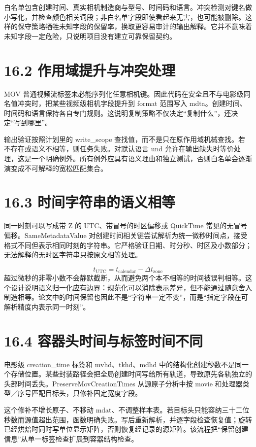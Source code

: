 \documentclass[UTF8,zihao=-4,openany]{ctexbook}
\begin{document}
白名单包含创建时间、真实相机制造商与型号、时间码和语言。冲突检测对键名做小写化，并检查颜色相关词段；非白名单字段即使看起来无害，也可能被删除。这样的保守策略牺牲未知字段的保留率，换取更容易审计的输出解释。它并不意味着未知字段一定危险，只说明项目没有建立可靠保留契约。


\section*{16.2 作用域提升与冲突处理}
MOV 普通视频流标签未必能序列化任意相机键。因此代码在安全且不与电影级同名值冲突时，把某些视频级相机字段提升到 format 范围写入 mdta。创建时间、时间码和语言保持各自专门规则。这说明复制策略不仅决定“复制什么”，还决定“写到哪里”。

输出验证按照计划里的 write\_scope 查找值，而不是只在原作用域机械查找。若不存在或语义不相等，则任务失败。对默认语言 und 允许在输出缺失时等价处理，这是一个明确例外。所有例外应具有语义理由和独立测试，否则白名单会逐渐演变成不可解释的宽松匹配集合。


\section*{16.3 时间字符串的语义相等}
同一时刻可以写成带 Z 的 UTC、带冒号的时区偏移或 QuickTime 常见的无冒号偏移。SameMetadataValue 对创建时间相关键尝试解析为统一微秒时间点，接受格式不同但表示相同时刻的字符串。它严格验证日期、时分秒、时区及小数部分；无法解释的无时区字符串只按原文相等处理。


\begin{equation}
t_{\mathrm{UTC}}=t_{\mathrm{calendar}}-\Delta t_{\mathrm{zone}}
\end{equation}
超过微秒的非零小数不会静默截断，从而避免两个本不相等的时间被误判相等。这个设计说明语义归一化应有边界：规范化可以消除表示差异，但不能通过随意舍入制造相等。论文中的时间保留也因此不是“字符串一定不变”，而是“指定字段在可解析精度内表示同一时刻”。


\section*{16.4 容器头时间与标签时间不同}
电影级 creation\_time 标签和 mvhd、tkhd、mdhd 中的结构化创建秒数不是同一个存储位置。某些封装路径会把全局创建时间写给所有轨道，导致原先各轨独立的头部时间丢失。PreserveMovCreationTimes 从源原子分析中按 movie 和处理器类型／序号匹配目标头，只修补固定宽度字段。

这个修补不增长原子、不移动 mdat、不调整样本表。若目标头只能容纳三十二位秒数而源值超出范围，函数明确失败。写后重新解析，并逐字段检查恢复值；旋转已经烘焙时同时写单位显示矩阵，否则恢复经记录的源矩阵。该流程把“保留创建信息”从单一标签检查扩展到容器结构检查。
\end{document}

